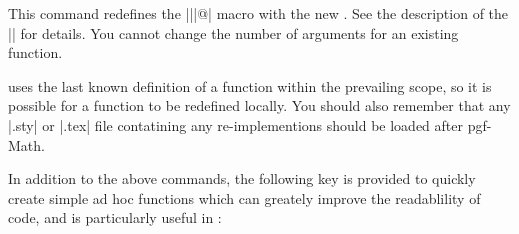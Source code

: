 \begin{command}{\pgfmathredeclarefunction{}}
  
  This command redefines the |\pgfmath||@| macro 
  with the new . See the description of the
  |\pgfmathdeclarefunction| for details. You cannot change the number
  of arguments for an existing function.

\end{command}

  \pgfname{} uses the last known definition of a function within the
  prevailing scope, so it is possible for a function to be redefined 
  locally. You should also remember that any |.sty| or |.tex| file
  contatining any re-implementions should be loaded after pgf-Math.

  In addition to the above commands, the following key is provided to 
  quickly create simple ad hoc functions which can greately improve 
  the readablility of code, and is particularly useful in \tikzname{}:

